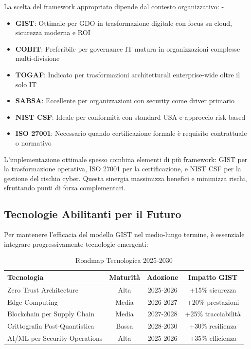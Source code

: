 La scelta del framework appropriato dipende dal contesto organizzativo: - \begin{itemize}
    \item \textbf{GIST}: Ottimale per GDO in trasformazione digitale con focus
    su cloud, sicurezza moderna e ROI
    \item \textbf{COBIT}: Preferibile per governance IT matura in organizzazioni complesse multi-divisione
    \item \textbf{TOGAF}: Indicato per trasformazioni architetturali enterprise-wide oltre il solo IT
    \item \textbf{SABSA}: Eccellente per organizzazioni con security come driver primario
    \item \textbf{NIST CSF}: Ideale per conformità con standard USA e approccio risk-based 
    \item \textbf{ISO 27001}: Necessario quando certificazione formale è
    requisito contrattuale o normativo
\end{itemize}
L’implementazione ottimale spesso combina elementi di più framework: GIST per la trasformazione operativa, ISO 27001 per la certificazione, e NIST CSF per la gestione del rischio cyber. Questa sinergia massimizza benefici e minimizza rischi, sfruttando punti di forza complementari.

\subsection{Tecnologie Abilitanti per il Futuro}
\label{subsec:5.6.2}

Per mantenere l'efficacia del modello GIST nel medio-lungo termine, è essenziale integrare progressivamente tecnologie emergenti:

\begin{table}[h!]
\centering
\caption{Roadmap Tecnologica 2025-2030}
\label{tab:tech_roadmap}
\begin{tabular}{|l|c|c|c|}
\hline
\textbf{Tecnologia} & \textbf{Maturità} & \textbf{Adozione} & \textbf{Impatto GIST} \\
\hline
Zero Trust Architecture & Alta & 2025-2026 & +15\% sicurezza \\
Edge Computing & Media & 2026-2027 & +20\% prestazioni \\
Blockchain per Supply Chain & Media & 2027-2028 & +25\% tracciabilità \\
Crittografia Post-Quantistica & Bassa & 2028-2030 & +30\% resilienza \\
AI/ML per Security Operations & Alta & 2025-2026 & +35\% efficienza \\
\hline
\end{tabular}
\end{table}

